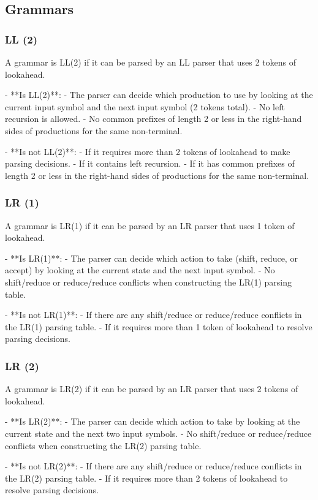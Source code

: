 \subsection{Grammars}
\subsubsection{LL (2)}
A grammar is LL(2) if it can be parsed by an LL parser that uses 2 tokens of lookahead.

- **Is LL(2)**: 
  - The parser can decide which production to use by looking at the current input symbol and the next input symbol (2 tokens total).
  - No left recursion is allowed.
  - No common prefixes of length 2 or less in the right-hand sides of productions for the same non-terminal.

- **Is not LL(2)**:
  - If it requires more than 2 tokens of lookahead to make parsing decisions.
  - If it contains left recursion.
  - If it has common prefixes of length 2 or less in the right-hand sides of productions for the same non-terminal.


\subsubsection{LR (1)}
A grammar is LR(1) if it can be parsed by an LR parser that uses 1 token of lookahead.

- **Is LR(1)**:
  - The parser can decide which action to take (shift, reduce, or accept) by looking at the current state and the next input symbol.
  - No shift/reduce or reduce/reduce conflicts when constructing the LR(1) parsing table.

- **Is not LR(1)**:
  - If there are any shift/reduce or reduce/reduce conflicts in the LR(1) parsing table.
  - If it requires more than 1 token of lookahead to resolve parsing decisions.


\subsubsection{LR (2)}
A grammar is LR(2) if it can be parsed by an LR parser that uses 2 tokens of lookahead.

- **Is LR(2)**:
  - The parser can decide which action to take by looking at the current state and the next two input symbols.
  - No shift/reduce or reduce/reduce conflicts when constructing the LR(2) parsing table.

- **Is not LR(2)**:
  - If there are any shift/reduce or reduce/reduce conflicts in the LR(2) parsing table.
  - If it requires more than 2 tokens of lookahead to resolve parsing decisions.


